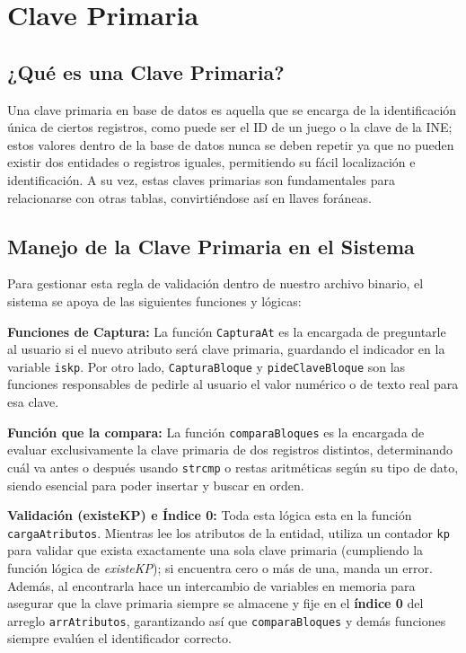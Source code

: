 \documentclass[12pt]{article}
\newcommand{\campo}[2]{
    \noindent\hangindent=1.2cm\makebox[0.6cm][l]{\color{MainBlue}\scriptsize$\bullet$} 
    \textbf{#1} #2 \par\vspace{0.1cm}
}
\begin{document}
\newpage
\section{Clave Primaria}
{}
\subsection*{¿Qué es una Clave Primaria?}
Una clave primaria en base de datos es aquella que se encarga de la 
identificación única de ciertos registros, como puede ser el ID de un juego o 
la clave de la INE; estos valores dentro de la base de datos nunca se deben 
repetir ya que no pueden existir dos entidades o registros iguales, 
permitiendo su fácil localización e identificación. 
A su vez, estas claves primarias son fundamentales para relacionarse 
con otras tablas, convirtiéndose así en llaves foráneas.

{}
\subsection*{Manejo de la Clave Primaria en el Sistema}
Para gestionar esta regla de validación dentro de nuestro archivo binario, 
el sistema se apoya de las siguientes funciones y lógicas:

\campo{Funciones de Captura:}{La función \texttt{CapturaAt} es la encargada de preguntarle al usuario si el nuevo atributo será clave primaria, guardando el indicador en la variable \texttt{iskp}. Por otro lado, \texttt{CapturaBloque} y \texttt{pideClaveBloque} son las funciones responsables de pedirle al usuario el valor numérico o de texto real para esa clave.}

\campo{Función que la compara:}{La función \texttt{comparaBloques} es la encargada de evaluar exclusivamente la clave primaria de dos registros distintos, determinando cuál va antes o después usando \texttt{strcmp} o restas aritméticas según su tipo de dato, siendo esencial para poder insertar y buscar en orden.}

\campo{Validación (existeKP) e Índice 0:}{Toda esta lógica esta en la función \texttt{cargaAtributos}. Mientras lee los atributos de la entidad, utiliza un contador \texttt{kp} para validar que exista exactamente una sola clave primaria (cumpliendo la función lógica de \textit{existeKP}); si encuentra cero o más de una, manda un error. Además, al encontrarla hace un intercambio de variables en memoria para asegurar que la clave primaria siempre se almacene y fije en el \textbf{índice 0} del arreglo \texttt{arrAtributos}, garantizando así que \texttt{comparaBloques} y demás funciones siempre evalúen el identificador correcto.}
\end{document}
